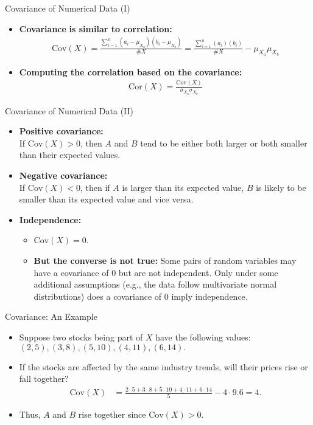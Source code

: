 \begin{frame}{Covariance of Numerical Data (I)}
	\begin{itemize}
		\item \textbf{\color{airforceblue}Covariance} \textbf{is similar to 
		correlation:}\\
		\begin{align}
			\text{Cov}(X) = 
			\frac{\sum_{i=1}^{n}(a_i-\mu_{X_a})(b_i-\mu_{X_b})}{\#X} = 
			\frac{\sum_{i=1}^{n}(a_i)(b_i)}{\#X}-\mu_{X_a}\mu_{X_b}
		\end{align}
		\item \textbf{Computing the correlation based on the covariance:}\\
		\begin{align}
			\text{Cor}({X}) = \frac{\text{Cov}(X)}{\sigma_{X_a}\sigma_{X_b}}
		\end{align}
	\end{itemize}
\end{frame}

\begin{frame}{Covariance of Numerical Data (II)}
	\begin{itemize}
		\item \textbf{Positive covariance:}\\
		If $\text{Cov}(X) > 0$, then $A$ and $B$ tend to be either both 
		larger or both smaller than their expected values.
		\item \textbf{Negative covariance:}\\
		If $\text{Cov}(X) < 0$, then if $A$ is larger than its expected 
		value, $B$ is likely to be smaller than its expected value and vice 
		versa.
		\item \textbf{Independence:}
		\begin{itemize}
			\item $\text{Cov}(X) = 0$.
			\item \textbf{\color{airforceblue}But the converse is not true:} 
			Some pairs of random variables may have a covariance of $0$ but are 
			not independent. Only under some additional assumptions (e.g., the 
			data follow multivariate normal distributions) does a covariance of 
			$0$ imply independence.
		\end{itemize}
	\end{itemize}
\end{frame}

\begin{frame}{Covariance: An Example}
	\begin{itemize}
		\item Suppose two stocks being part of $X$ have the following values:\\
		$(2,5), (3,8), (5,10), (4,11), (6,14).$
		\item If the stocks are affected by the same industry trends, will 
		their prices rise or fall together?
		\begin{align}
			\text{Cov}(X) & = \frac{2\cdot5 + 3\cdot 8 + 5 \cdot 10 + 4 \cdot 
			11 + 6 \cdot 14}{5} - 4\cdot 9.6 = 4. 
		\end{align}
		\item Thus, $A$ and $B$ rise together since $\text{Cov}(X) > 0$.
	\end{itemize}
\end{frame}